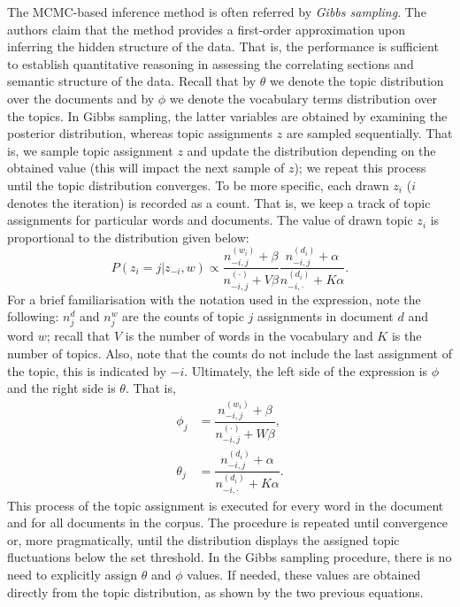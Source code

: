 \documentclass{mprop}
\begin{document}
\par The MCMC-based inference method is often referred by \textit{Gibbs sampling}. The authors claim that the method provides a first-order approximation upon inferring the hidden structure of the data. That is, the performance is sufficient to establish quantitative reasoning in assessing the correlating sections and semantic structure of the data. Recall that by $\theta$ we denote the topic distribution over the documents and by $\phi$ we denote the vocabulary terms distribution over the topics. In Gibbs sampling, the latter variables are obtained by examining the posterior distribution, whereas topic assignments $z$ are sampled sequentially. That is, we sample topic assignment $z$ and update the distribution depending on the obtained value (this will impact the next sample of $z$); we repeat this process until the topic distribution converges. To be more specific, each drawn $z_i$ ($i$ denotes the iteration) is recorded as a count. That is, we keep a track of topic assignments for particular words and documents. The value of drawn topic $z_i$ is proportional to the distribution given below:
\begin{equation}
P(z_i = j | z_{-i}, w) \propto \dfrac{n_{-i, j}^{(w_i)} + \beta}{n_{-i, j}^{(\cdot)} + V\beta}\dfrac{n_{-i, j}^{(d_i)} + \alpha}{n_{-i, \cdot}^{(d_i)} + K\alpha}.
\end{equation}
For a brief familiarisation with the notation used in the expression, note the following: $n_j^{d}$ and $n_j^{w}$ are the counts of topic $j$ assignments in document $d$ and word $w$; recall that $V$ is the number of words in the vocabulary and $K$ is the number of topics. Also, note that the counts do not include the last assignment of the topic, this is indicated by $-i$. Ultimately, the left side of the expression is $\phi$ and the right side is $\theta$. That is, 
\begin{align}
\phi_j &= \dfrac{n_{-i, j}^{(w_i)} + \beta}{n_{-i, j}^{(\cdot)} + W\beta},\\
\theta_j &= \dfrac{n_{-i, j}^{(d_i)} + \alpha}{n_{-i, \cdot}^{(d_i)} + K\alpha}.
\end{align}
This process of the topic assignment is executed for every word in the document and for all documents in the corpus. The procedure is repeated until convergence or, more pragmatically, until the distribution displays the assigned topic fluctuations below the set threshold. In the Gibbs sampling procedure, there is no need to explicitly assign $\theta$ and $\phi$ values. If needed, these values are obtained directly from the topic distribution, as shown by the two previous equations.
\end{document}
